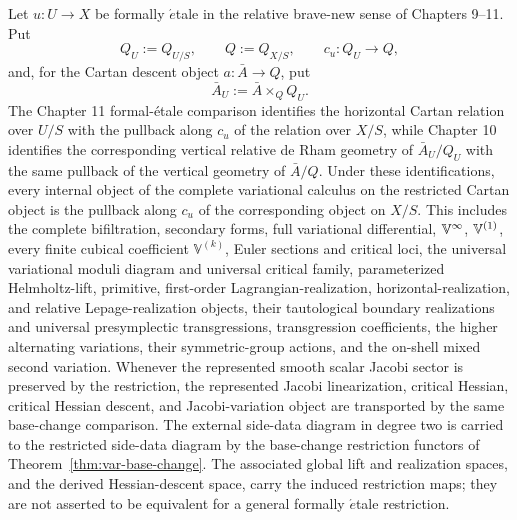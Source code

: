 \begin{theorem}
\label{thm:var-formal-etale}
Let \(u:U\to X\) be formally \(\acute{e}\)tale in the relative brave-new sense of Chapters 9--11. Put
\[
    Q_U:=Q_{U/S},
    \qquad
    Q:=Q_{X/S},
    \qquad
    c_u:Q_U\longrightarrow Q,
\]
and, for the Cartan descent object \(a:\bar A\to Q\), put
\[
    \bar A_U:=\bar A\times_QQ_U.
\]
The Chapter 11 formal-\'etale comparison identifies the horizontal Cartan relation over \(U/S\) with the pullback along \(c_u\) of the relation over \(X/S\), while Chapter 10 identifies the corresponding vertical relative de Rham geometry of \(\bar A_U/Q_U\) with the same pullback of the vertical geometry of \(\bar A/Q\). Under these identifications, every internal object of the complete variational calculus on the restricted Cartan object is the pullback along \(c_u\) of the corresponding object on \(X/S\). This includes the complete bifiltration, secondary forms, full variational differential, \(\mathbb V^{\infty}\), \(\mathbb V^{(1)}\), every finite cubical coefficient \(\mathbb V^{(k)}\), Euler sections and critical loci, the universal variational moduli diagram and universal critical family, parameterized Helmholtz-lift, primitive, first-order Lagrangian-realization, horizontal-realization, and relative Lepage-realization objects, their tautological boundary realizations and universal presymplectic transgressions, transgression coefficients, the higher alternating variations, their symmetric-group actions, and the on-shell mixed second variation.  Whenever the represented smooth scalar Jacobi sector is preserved by the restriction, the represented Jacobi linearization, critical Hessian, critical Hessian descent, and Jacobi-variation object are transported by the same base-change comparison. The external side-data diagram in degree two is carried to the restricted side-data diagram by the base-change restriction functors of Theorem~\ref{thm:var-base-change}. The associated global lift and realization spaces, and the derived Hessian-descent space, carry the induced restriction maps; they are not asserted to be equivalent for a general formally \(\acute{e}\)tale restriction.
\end{theorem}

